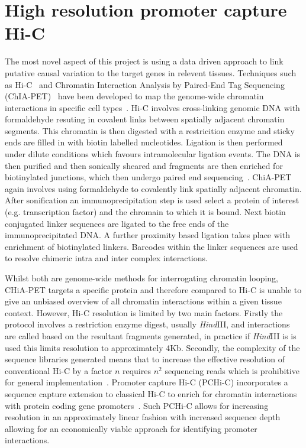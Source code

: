 \documentclass[a4paper,11pt]{report}
\begin{document}
\section{High resolution promoter capture Hi-C}
The most novel aspect of this project is using a data driven approach to link putative causal variation to the target genes in relevent tissues. Techniques such as Hi-C~\citep{Lieberman-AidenvanBerkumWilliamsEtAl2009} and  Chromatin Interaction Analysis by Paired-End Tag Sequencing (ChIA-PET)~\citep{FullwoodLiuPanEtAl2009} have been developed to map the genome-wide chromatin interactions in specific cell types~\citep{RaoHuntleyDurandEtAl2014}. Hi-C involves cross-linking genomic DNA with formaldehyde resuting in covalent links between spatially adjacent chromatin segments. This chromatin is then digested with a restricition enzyme and sticky ends are filled in with biotin labelled nucleotides. Ligation is then performed under dilute conditions which favours intramolecular ligation events. The DNA is then purified and then sonically sheared and fragments are then enriched for biotinylated junctions, which then undergo paired end sequencing~\citep{vanBerkumLieberman-AidenWilliamsEtAl2010}. ChiA-PET again involves using formaldehyde to covalently link spatially adjacent chromatin. After sonification an immunoprecipitation step is used select a protein of interest (e.g. transcription factor) and the chromain to which it is bound. Next biotin conjugated linker sequences are ligated to the free ends of the immunoprecipitated DNA. A further proximity based ligation takes place with enrichment of biotinylated linkers. Barcodes within the linker sequences are used to resolve chimeric intra and inter complex interactions. 

Whilst both are genome-wide methods for interrogating chromatin looping, CHiA-PET targets a specific protein and therefore compared to Hi-C is unable to give an unbiased overview of all chromatin interactions within a given tissue context. However, Hi-C resolution is limited by two main factors. Firstly the protocol involves a restriction enzyme digest, usually \textit{Hind}III, and interactions are called based on the resultant fragments generated, in practice if \textit{Hind}III is is used this limits resolution to approximately 4Kb. Secondly,  the complexity of the sequence libraries generated means that to increase the effective resolution of conventional Hi-C by a factor $n$ requires $n^{2}$ sequencing reads which is prohibitive for general implementation~\citep{JaegerMiglioriniHenrionEtAl2015}. Promoter capture Hi-C (PCHi-C) incorporates a sequence capture extension to classical Hi-C to enrich for chromatin interactions with protein coding gene promoters~\citep{Mifsud2015-fm}. Such PCHi-C allows for increasing resolution in an approximately linear fashion with increased sequence depth allowing for an economically viable approach for identifying promoter interactions. 
\end{document}
